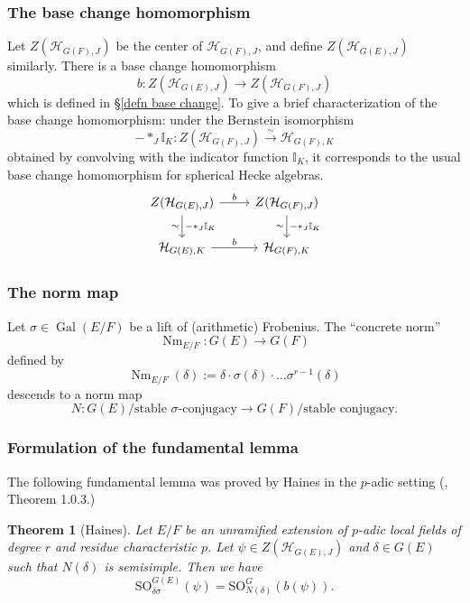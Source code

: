 \documentclass[reqno]{amsart}
\numberwithin{equation}{section}
\newcommand{\Gal}{\operatorname{Gal}}
\newcommand{\mbb}[1]{\mathbb{#1}}
\newcommand{\Cal}[1]{\mathcal{#1}}
\newcommand{\co}{\colon}
\newcommand{\mrm}[1]{\mathrm{#1}}
\DeclareMathOperator{\Nm}{Nm}
\newtheorem{thm}{Theorem}[section]
\theoremstyle{remark}
\numberwithin{equation}{section}
\begin{document}
\subsubsection{The base change homomorphism} Let $Z(\Cal{H}_{G(F),J})$ be the center of $\Cal{H}_{G(F),J}$, and define $Z(\Cal{H}_{G(E),J})$ similarly. There is a base change homomorphism 
\[
b \co Z(\Cal{H}_{G(E),J}) \rightarrow Z(\Cal{H}_{G(F),J})
\]
which is defined in \S \ref{defn base change}. To give a brief characterization of the base change homomorphism: under the Bernstein isomorphism 
\[
- *_J \mbb{I}_K\co Z(\Cal{H}_{G(F),J}) \xrightarrow{\sim} \Cal{H}_{G(F),K}
\]
obtained by convolving with the indicator function $\mbb{I}_K$, it corresponds to the usual base change homomorphism for spherical Hecke algebras.  
\[
\begin{tikzcd}
Z(\Cal{H}_{G(E), J}) \ar[r, "b"] \ar[d, "- *_J \mbb{I}_K", "\sim"']  & Z(\Cal{H}_{G(F), J}) \ar[d, "- *_J \mbb{I}_K", "\sim"'] \\
\Cal{H}_{G(E), K} \ar[r, "b"] & \Cal{H}_{G(F), K}
\end{tikzcd}
\]

\subsubsection{The norm map} Let $\sigma \in \Gal(E/F)$ be a lift of (arithmetic) Frobenius. The ``concrete norm''
\[
\Nm_{E/F} \co G(E) \rightarrow G(F)
\]
defined by 
\[
\Nm_{E/F} (\delta) := \delta \cdot \sigma(\delta) \cdot \ldots \sigma^{r-1} (\delta)
\]
descends to a norm map 
\[
N \co G(E)/\text{stable $\sigma$-conjugacy} \rightarrow G(F)/\text{stable conjugacy}.
\]



\subsubsection{Formulation of the fundamental lemma}

The following fundamental lemma was proved by Haines in the $p$-adic setting (\cite{Haines09}, Theorem 1.0.3.)

\begin{thm}[Haines]\label{FL formulation}
Let $E/F$ be an unramified extension of $p$-adic local fields of degree $r$ and residue characteristic $p$. Let $\psi \in Z(\Cal{H}_{G(E),J})$ and $\delta \in G(E)$ such that $N(\delta)$ is semisimple. Then we have
\[
  \mrm{SO}_{\delta \sigma}^{G(E)}(\psi) = \mrm{SO}_{N(\delta)}^G (b(\psi)).
\]
\end{thm}
\end{document}
